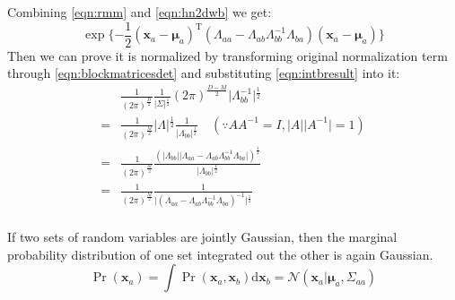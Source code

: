 Combining \eqref{eqn:rmm} and \eqref{eqn:hn2dwb} we get:
\begin{equation}
\exp{}\{-\frac{1}{2}(\mathbf{x}_{a}-\boldsymbol{\mu}_{a})^{\mathrm{T}}(\Lambda_{aa}-\Lambda_{ab}\Lambda_{bb}^{-1}\Lambda_{ba})(\mathbf{x}_{a}-\boldsymbol{\mu}_{a})\}
\label{eqn:margmd}
\end{equation}
Then we can prove it is normalized by transforming original
normalization term through \eqref{eqn:blockmatricesdet} and substituting
\eqref{eqn:intbresult} into it:
\begin{equation}
\begin{split}
&\frac{1}{(2\pi)^{\frac{D}{2}}}\frac{1}{\vert{}\Sigma\vert{}^{\frac{1}{2}}}(2\pi)^{\frac{D-M}{2}}\vert{}\Lambda_{bb}^{-1}\vert{}^{\frac{1}{2}}\\
=&\frac{1}{(2\pi)^{\frac{M}{2}}}\vert{}\Lambda\vert{}^{\frac{1}{2}}\frac{1}{\vert{}\Lambda_{bb}\vert{}^{\frac{1}{2}}}\quad{}(\because{}AA^{-1}=I,\vert{}A\vert{}\vert{}A^{-1}\vert{}=1)\\
=&\frac{1}{(2\pi)^{\frac{M}{2}}}\frac{(\vert{}\Lambda_{bb}\vert{}\vert{}\Lambda_{aa}-\Lambda_{ab}\Lambda_{bb}^{-1}\Lambda_{ba}\vert{})^{\frac{1}{2}}}{\vert{}\Lambda_{bb}\vert{}^{\frac{1}{2}}}\\
=&\frac{1}{(2\pi)^{\frac{M}{2}}}\frac{1}{\vert{}(\Lambda_{aa}-\Lambda_{ab}\Lambda_{bb}^{-1}\Lambda_{ba})^{-1}\vert{}^{\frac{1}{2}}}\\
\end{split}
\end{equation}
\begin{conclusion}
If two sets of random variables are jointly Gaussian, then the
marginal probability distribution of one set integrated out the other
is again Gaussian.
\begin{equation}
\Pr(\mathbf{x}_a)=\int{}\Pr(\mathbf{x}_{a},\mathbf{x}_{b})\text{d}\mathbf{x}_{b}=\mathcal{N}(\mathbf{x}_{a}\vert{}\boldsymbol{\mu}_{a},\Sigma_{aa})
\label{eqn:marggaussian}
\end{equation}
\end{conclusion}
